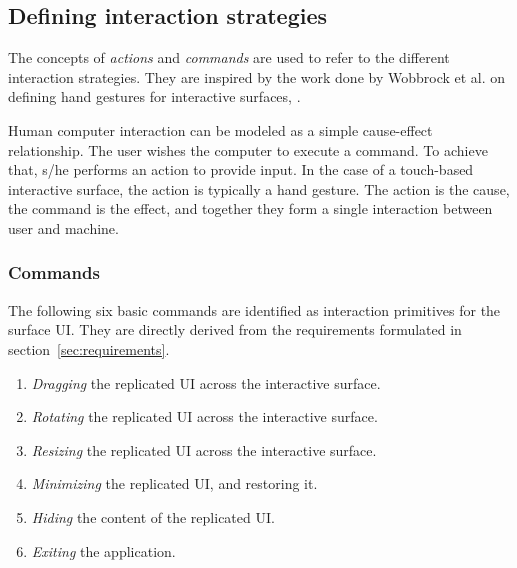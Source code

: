 

\subsection{Defining interaction strategies}
\label{sec:strategies}

The concepts of \emph{actions} and \emph{commands} are used to refer to the different interaction strategies.
They are inspired by the work done by Wobbrock et al. on defining hand gestures for interactive surfaces, \citep{Wobbrock:2009:gestures}.

Human computer interaction can be modeled as a simple cause-effect relationship.
The user wishes the computer to execute a command.
To achieve that, s/he performs an action to provide input.
In the case of a touch-based interactive surface, the action is typically a hand gesture.
The action is the cause, the command is the effect, and together they form a single interaction between user and machine.

\subsubsection{Commands}

The following six basic commands are identified as interaction primitives for the surface UI.
They are directly derived from the requirements formulated in section~\ref{sec:requirements}.

\begin{enumerate}
\item{\emph{Dragging} the replicated UI across the interactive surface.}
\item{\emph{Rotating} the replicated UI across the interactive surface.}
\item{\emph{Resizing} the replicated UI across the interactive surface.}
\item{\emph{Minimizing} the replicated UI, and restoring it.}
\item{\emph{Hiding} the content of the replicated UI.}
\item{\emph{Exiting} the application.}
\end{enumerate}

